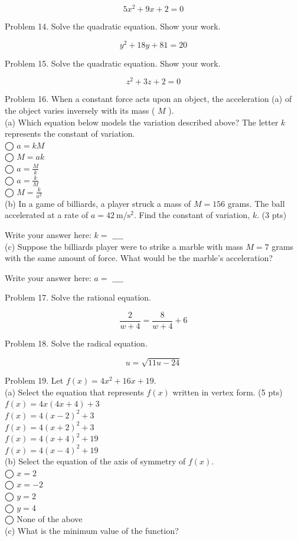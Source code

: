 \documentclass{ximera}
\begin{document}
$$5 x^{2}+9 x+2=0$$

Problem 14. Solve the quadratic equation. Show your work.

$$y^{2}+18 y+81=20$$

Problem 15. Solve the quadratic equation. Show your work.

$$z^{2}+3 z+2=0$$

Problem 16. When a constant force acts upon an object, the acceleration (a) of the object varies inversely with its mass ( $M$ ).\\
(a) Which equation below models the variation described above? The letter $k$ represents the constant of variation.\\
◯ $a=k M$\\
◯ $M=a k$\\
◯ $a=\frac{M}{k}$\\
◯ $a=\frac{k}{M}$\\
◯ $M=\frac{k}{a^{2}}$\\
(b) In a game of billiards, a player struck a mass of $M=156$ grams. The ball accelerated at a rate of $a=42 \mathrm{~m} / \mathrm{s}^{2}$. Find the constant of variation, $k$. (3 pts)

Write your answer here: $k=$ $\_\_\_\_$\\
(c) Suppose the billiards player were to strike a marble with mass $M=7$ grams with the same amount of force. What would be the marble's acceleration?

Write your answer here: $a=$ $\_\_\_\_$

Problem 17. Solve the rational equation.

$$\frac{2}{w+4}=\frac{8}{w+4}+6$$

Problem 18. Solve the radical equation.

$$u=\sqrt{11 u-24}$$

Problem 19. Let $f(x)=4 x^{2}+16 x+19$.\\
(a) Select the equation that represents $f(x)$ written in vertex form. (5 pts)\\
$f(x)=4 x(4 x+4)+3$\\
$f(x)=4(x-2)^{2}+3$\\
$f(x)=4(x+2)^{2}+3$\\
$f(x)=4(x+4)^{2}+19$\\
$f(x)=4(x-4)^{2}+19$\\
(b) Select the equation of the axis of symmetry of $f(x)$.\\
◯ $x=2$\\
◯ $x=-2$\\
◯ $y=2$\\
◯ $y=4$\\
◯ None of the above\\
(c) What is the minimum value of the function?
\end{document}
